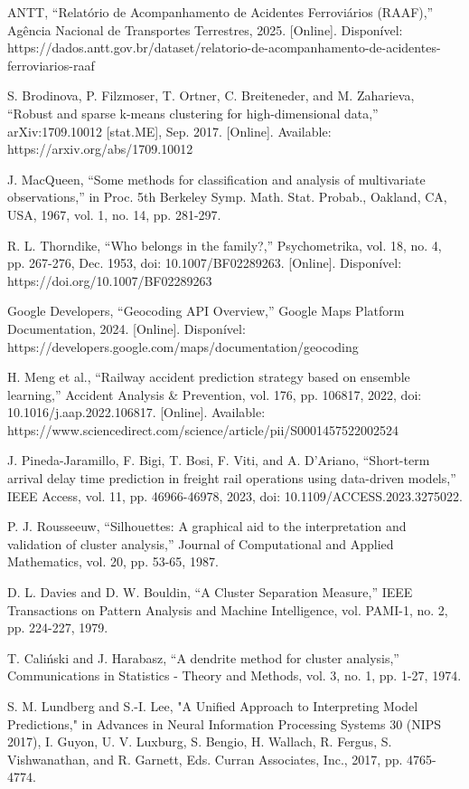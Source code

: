 \documentclass[conference]{IEEEtran}
\begin{document}
\renewcommand{\refname}{Referências}
\begin{thebibliography}{00}
 ANTT, ``Relatório de Acompanhamento de Acidentes Ferroviários (RAAF),'' Agência Nacional de Transportes Terrestres, 2025. [Online]. Disponível: https://dados.antt.gov.br/dataset/relatorio-de-acompanhamento-de-acidentes-ferroviarios-raaf

 S. Brodinova, P. Filzmoser, T. Ortner, C. Breiteneder, and M. Zaharieva, ``Robust and sparse k-means clustering for high-dimensional data,'' arXiv:1709.10012 [stat.ME], Sep. 2017. [Online]. Available: https://arxiv.org/abs/1709.10012

 J. MacQueen, ``Some methods for classification and analysis of multivariate observations,'' in Proc. 5th Berkeley Symp. Math. Stat. Probab., Oakland, CA, USA, 1967, vol. 1, no. 14, pp. 281-297.

 R. L. Thorndike, ``Who belongs in the family?,'' Psychometrika, vol. 18, no. 4, pp. 267-276, Dec. 1953, doi: 10.1007/BF02289263. [Online]. Disponível: https://doi.org/10.1007/BF02289263

 Google Developers, ``Geocoding API Overview,'' Google Maps Platform Documentation, 2024. [Online]. Disponível: https://developers.google.com/maps/documentation/geocoding

 H. Meng et al., ``Railway accident prediction strategy based on ensemble learning,'' Accident Analysis \& Prevention, vol. 176, pp. 106817, 2022, doi: 10.1016/j.aap.2022.106817. [Online]. Available: https://www.sciencedirect.com/science/article/pii/S0001457522002524

 J. Pineda-Jaramillo, F. Bigi, T. Bosi, F. Viti, and A. D'Ariano, ``Short-term arrival delay time prediction in freight rail operations using data-driven models,'' IEEE Access, vol. 11, pp. 46966-46978, 2023, doi: 10.1109/ACCESS.2023.3275022.

 P. J. Rousseeuw, ``Silhouettes: A graphical aid to the interpretation and validation of cluster analysis,'' Journal of Computational and Applied Mathematics, vol. 20, pp. 53-65, 1987.

 D. L. Davies and D. W. Bouldin, ``A Cluster Separation Measure,'' IEEE Transactions on Pattern Analysis and Machine Intelligence, vol. PAMI-1, no. 2, pp. 224-227, 1979.

 T. Caliński and J. Harabasz, ``A dendrite method for cluster analysis,'' Communications in Statistics - Theory and Methods, vol. 3, no. 1, pp. 1-27, 1974.

 S. M. Lundberg and S.-I. Lee, "A Unified Approach to Interpreting Model Predictions," in Advances in Neural Information Processing Systems 30 (NIPS 2017), I. Guyon, U. V. Luxburg, S. Bengio, H. Wallach, R. Fergus, S. Vishwanathan, and R. Garnett, Eds. Curran Associates, Inc., 2017, pp. 4765-4774.

\end{thebibliography}
\end{document}
